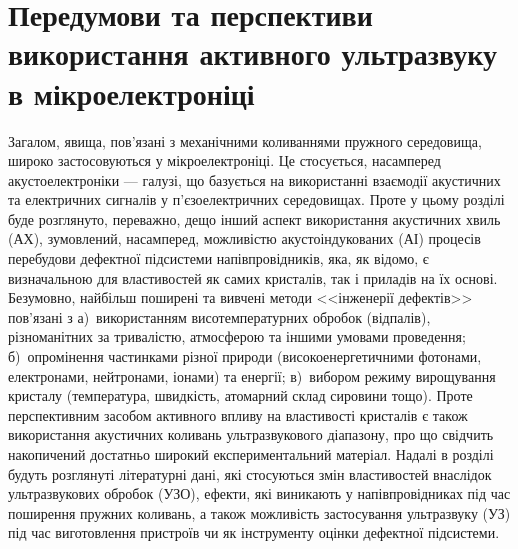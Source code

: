 \chapter{Передумови та перспективи використання активного ультразвуку в мікроелектроніці\label{Oglyad}}


Загалом, явища, пов'язані з механічними коливаннями пружного середовища, широко застосовуються у мікроелектроніці.
Це стосується, насамперед акустоелектроніки --- галузі, що базується на використанні взаємодії акустичних та електричних сигналів у п'єзоелектричних середовищах.
Проте у цьому розділі буде розглянуто, переважно, дещо інший аспект використання акустичних хвиль (АХ),
зумовлений, насамперед, можливістю акустоіндукованих (АІ) процесів перебудови дефектної підсистеми напівпровідників, яка, як відомо, є визначальною для властивостей як самих кристалів, так і приладів на їх основі.
Безумовно, найбільш поширені та вивчені методи <<інженерії дефектів>> пов'язані з
а)~використанням висотемпературних обробок (відпалів), різноманітних за тривалістю, атмосферою та іншими умовами проведення;
б)~опромінення частинками різної природи (високоенергетичними фотонами, електронами, нейтронами, іонами) та енергії;
в)~вибором режиму вирощування кристалу (температура, швидкість, атомарний склад сировини тощо).
Проте перспективним засобом активного впливу на властивості кристалів є також використання акустичних коливань ультразвукового діапазону, про що свідчить накопичений достатньо широкий експериментальний матеріал.
Надалі в розділі будуть розглянуті літературні дані, які стосуються змін властивостей внаслідок ультразвукових обробок (УЗО), ефекти, які виникають у напівпровідниках під час поширення пружних коливань,
а також можливість застосування ультразвуку (УЗ) під час виготовлення пристроїв чи як інструменту оцінки дефектної підсистеми.

